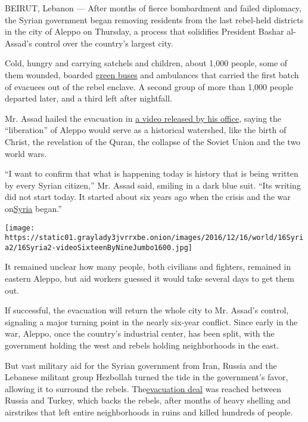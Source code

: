 BEIRUT, Lebanon --- After months of fierce bombardment and failed
diplomacy, the Syrian government began removing residents from the last
rebel-held districts in the city of Aleppo on Thursday, a process that
solidifies President Bashar al-Assad's control over the country's
largest city.

Cold, hungry and carrying satchels and children, about 1,000 people,
some of them wounded, boarded
\href{https://www.nytimes3xbfgragh.onion/2016/10/30/world/middleeast/once-propelled-by-hope-for-a-modern-syria-green-buses-now-run-on-tears.html}{green
buses} and ambulances that carried the first batch of evacuees out of
the rebel enclave. A second group of more than 1,000 people departed
later, and a third left after nightfall.

Mr. Assad hailed the evacuation in
\href{https://www.youtube.com/watch?v=oLP6-jilHgU\&feature=youtu.be}{a
video released by his office}, saying the ``liberation'' of Aleppo would
serve as a historical watershed, like the birth of Christ, the
revelation of the Quran, the collapse of the Soviet Union and the two
world wars.

``I want to confirm that what is happening today is history that is
being written by every Syrian citizen,'' Mr. Assad said, smiling in a
dark blue suit. ``Its writing did not start today. It started about six
years ago when the crisis and the war
on\href{https://www.nytimes3xbfgragh.onion/topic/destination/syria?8qa}{Syria}
began.''

\texttt{[image: https://static01.graylady3jvrrxbe.onion/images/2016/12/16/world/16Syria2/16Syria2-videoSixteenByNineJumbo1600.jpg]}

It remained unclear how many people, both civilians and fighters,
remained in eastern Aleppo, but aid workers guessed it would take
several days to get them out.

If successful, the evacuation will return the whole city to Mr. Assad's
control, signaling a major turning point in the nearly six-year
conflict. Since early in the war, Aleppo, once the country's industrial
center, has been split, with the government holding the west and rebels
holding neighborhoods in the east.

But vast military aid for the Syrian government from Iran, Russia and
the Lebanese militant group Hezbollah turned the tide in the
government's favor, allowing it to surround the rebels.
The\href{https://www.nytimes3xbfgragh.onion/2016/12/13/world/middleeast/syria-aleppo-civilians.html?rref=collection\%2Fbyline\%2Fanne-barnard\&action=click\&contentCollection=undefined\&region=stream\&module=stream_unit\&version=latest\&contentPlacement=3\&pgtype=collection}{evacuation
deal} was reached between Russia and Turkey, which backs the rebels,
after months of heavy shelling and airstrikes that left entire
neighborhoods in ruins and killed hundreds of people.

